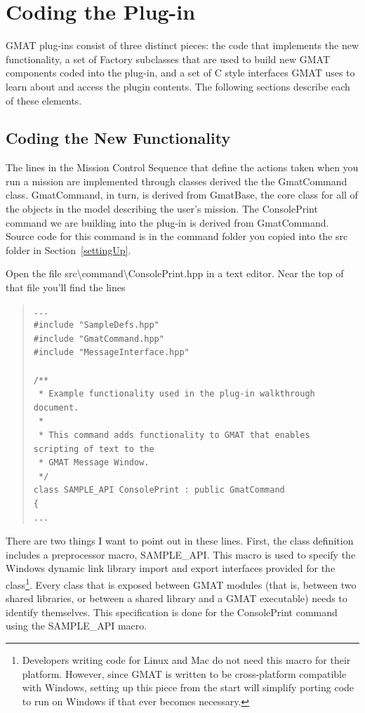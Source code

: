 \documentclass[10pt,letterpaper]{article}
\begin{document}
\section{Coding the Plug-in}

GMAT plug-ins consist of three distinct pieces: the code that implements the new functionality, a set of Factory subclasses that are used to build new GMAT components coded into the plug-in, and a set of C style interfaces GMAT uses to learn about and access the plugin contents.  The following sections describe each of these elements.

\subsection{Coding the New Functionality}

The lines in the Mission Control Sequence that define the actions taken when you run a mission are implemented through classes derived the the GmatCommand class.  GmatCommand, in turn, is derived from GmatBase, the core class for all of the objects in the model describing the user's mission.  The ConsolePrint command we are building into the plug-in is derived from GmatCommand.  Source code for this command is in the command folder you copied into the src folder in Section~\ref{settingUp}.

Open the file src{\textbackslash}command{\textbackslash}ConsolePrint.hpp in a text editor.  Near the top of that file you'll find the lines

\begin{quote}
\begin{verbatim}
...
#include "SampleDefs.hpp"
#include "GmatCommand.hpp"
#include "MessageInterface.hpp"

/** 
 * Example functionality used in the plug-in walkthrough document.
 *
 * This command adds functionality to GMAT that enables scripting of text to the
 * GMAT Message Window.
 */
class SAMPLE_API ConsolePrint : public GmatCommand
{
...
\end{verbatim}
\end{quote}

There are two things I want to point out in these lines.  First, the class definition includes a preprocessor macro, SAMPLE{\_}API.  This macro is used to specify the Windows dynamic link library import and export interfaces provided for the class\footnote{Developers writing code for Linux and Mac do not need this macro for their platform.  However, since GMAT is written to be cross-platform compatible with Windows, setting up this piece from the start will simplify porting code to run on Windows if that ever becomes necessary.}.  Every class that is exposed between GMAT modules (that is, between two shared libraries, or between a shared library and a GMAT executable) needs to identify themselves.  This specification is done for the ConsolePrint command using the SAMPLE{\_}API macro.  
\end{document}
